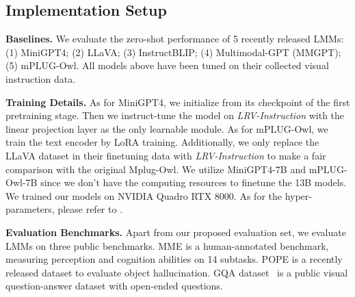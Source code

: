 
\subsection{Implementation Setup}
\vspace{-0.1in}
\textbf{Baselines. }We evaluate the zero-shot performance of 5 recently released LMMs: (1) MiniGPT4; (2) LLaVA; (3) InstructBLIP; (4) Multimodal-GPT (MMGPT); (5) mPLUG-Owl. All models above have been tuned on their collected visual instruction data. 


\textbf{Training Details. }As for MiniGPT4, we initialize from its checkpoint of the first pretraining stage. Then we instruct-tune the model on \textit{LRV-Instruction} with the linear projection layer as the only learnable module. As for mPLUG-Owl, we train the text encoder by LoRA training. Additionally, we only replace the LLaVA dataset in their finetuning data with \textit{LRV-Instruction} to make a fair comparison with the original Mplug-Owl. We utilize MiniGPT4-7B and mPLUG-Owl-7B since we don’t have the computing resources to finetune the 13B models. We trained our models on NVIDIA Quadro RTX 8000. As for the hyper-parameters, please refer to \citep{zhu2023minigpt, ye2023mplug}.

\textbf{Evaluation Benchmarks. }Apart from our proposed evaluation set, we evaluate LMMs on three public benchmarks. MME \citep{fu2023mme} is a human-annotated benchmark, measuring perception and cognition abilities on 14 subtasks. POPE \citep{li2023evaluating} is a recently released dataset to evaluate object hallucination. GQA dataset~\citep{hudson2019gqa} is a public visual question-answer dataset with open-ended questions.




